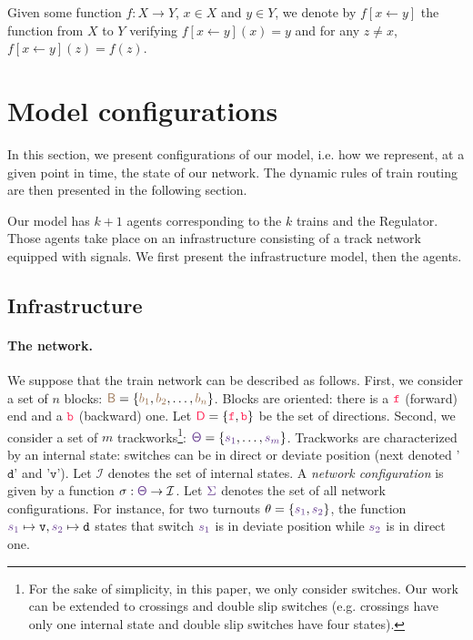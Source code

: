 \documentclass[runningheads]{llncs}
\newcommand{\directions}{\dirFmt{\mathsf{D}}}
\newcommand{\internalState}{{\mathcal{I}}}
\newcommand{\forward}{\ensuremath{\mathtt{f}}}
\newcommand{\backward}{\ensuremath{\mathtt{b}}\xspace}
\newcommand{\dirFmt}[1]{{\color{dircolor} #1}}
\newcommand{\dirForward}{\ensuremath{\dirFmt{\forward}}\xspace}
\newcommand{\dirBackward}{\ensuremath{\dirFmt{\backward}}\xspace}
\newcommand{\posFmt}[1]{{\color{poscolor}{#1}}}
\newcommand{\blocks}{{\posFmt{\mathsf{B}}}}
\newcommand{\bid}[1]{\ensuremath{\posFmt{b_{#1}}}}
\newcommand{\swFmt}[1]{{\color{swcolor}{#1}}}
\newcommand{\sid}[1]{\ensuremath{\swFmt{s_{#1}}}}
\newcommand{\turnouts}{\swFmt{\mathsf{\Theta}}}
\newcommand{\networkConf}{\ensuremath{\swFmt{\Sigma}}}
\newcommand{\deviate}{{\mbox{$\mathtt{v}$}}\xspace}
\newcommand{\direct}{{\mbox{$\mathtt{d}$}}\xspace}
\begin{document}
Given some function $f: X \to Y$, $x \in X$ and $y \in Y$, we denote by $f[x \leftarrow y]$ the function from $X$ to $Y$ verifying $f[x \leftarrow y](x) = y$ and for any $z \neq x$, $f[x \leftarrow y](z) = f(z)$.

\section{Model configurations}
\label{sec:model_configurations}

In this section, we present configurations of our model, i.e. how we represent, at a given point in time, the state of our network. The dynamic rules of train routing are then presented in the following section.

Our model has $k+1$ agents corresponding to the $k$ trains and the Regulator. Those agents take place on an infrastructure consisting of a track network equipped with signals. We first present the infrastructure model, then the agents.

\subsection{Infrastructure}

\paragraph{The network.} 

We suppose that the train network can be described as follows. First, we consider a set of $n$ blocks: $\blocks = \{ \bid{1}, \bid{2}, \ldots, \bid{n}\}$. Blocks are oriented: there is a $\dirForward$ (forward) end and a $\dirBackward$ (backward) one. Let $\directions = \{\dirForward, \dirBackward\}$ be the set of directions.  Second, we consider a set of $m$ trackworks\footnote{For the sake of simplicity, in this paper, we only consider switches. Our work can  be extended to crossings and double slip switches (e.g. crossings have only one internal state and double slip switches have four states).}: $\turnouts = \{\sid{1}, \ldots, \sid{m}\}$. Trackworks are characterized by an internal state: switches can be in direct or deviate position (next denoted '\direct' and '\deviate'). Let $\internalState$ denotes the set of internal states. A \emph{network configuration} is given by a function $\sigma: \turnouts \to \internalState$. Let $\networkConf$ denotes the set of all network configurations. For instance, for two turnouts $\theta = \{\sid{1}, \sid{2}\}$, the function $\sid{1} \mapsto \deviate, \sid{2} \mapsto \direct$ states that switch $\sid{1}$ is in deviate position while \sid{2} is in direct one.
\end{document}
